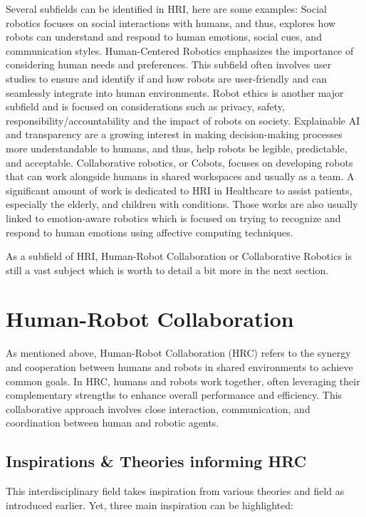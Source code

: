 Several subfields can be identified in HRI, here are some examples:
Social robotics focuses on social interactions with humans, and thus, explores how robots can understand and respond to human emotions, social cues, and communication styles.
Human-Centered Robotics emphasizes the importance of considering human needs and preferences. This subfield often involves user studies to ensure and identify if and how robots are user-friendly and can seamlessly integrate into human environments.
Robot ethics is another major subfield and is focused on considerations such as privacy, safety, responsibility/accountability and the impact of robots on society.
Explainable AI and transparency are a growing interest in making decision-making processes more understandable to humans, and thus, help robots be legible, predictable, and acceptable.
Collaborative robotics, or Cobots, focuses on developing robots that can work alongside humans in shared workspaces and usually as a team.
A significant amount of work is dedicated to HRI in Healthcare to assist patients, especially the elderly, and children with conditions. Those works are also usually linked to emotion-aware robotics which is focused on trying to recognize and respond to human emotions using affective computing techniques.   

As a subfield of HRI, Human-Robot Collaboration or Collaborative Robotics is still a vast subject which is worth to detail a bit more in the next section.

\section{Human-Robot Collaboration}

As mentioned above, Human-Robot Collaboration (HRC) refers to the synergy and cooperation between humans and robots in shared environments to achieve common goals. In HRC, humans and robots work together, often leveraging their complementary strengths to enhance overall performance and efficiency. This collaborative approach involves close interaction, communication, and coordination between human and robotic agents.

\subsection{Inspirations \& Theories informing HRC}

This interdisciplinary field takes inspiration from various theories and field as introduced earlier. Yet, three main inspiration can be highlighted:

